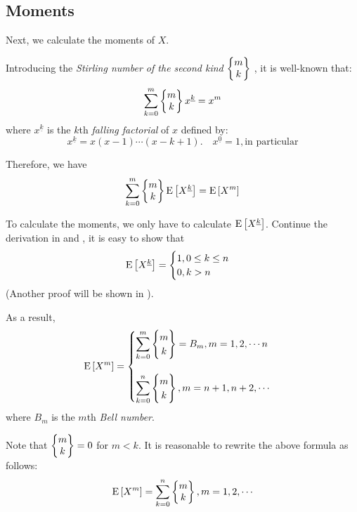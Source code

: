 \subsection{Moments}
\label{sec:moments}
Next, we calculate the moments of $ X$.

Introducing the \emph{Stirling number of the second kind}  $ \left\{\begin{matrix}m\\k\end{matrix}\right\} $ , it is well-known that:
\[ \sum_{k=0}^m\Stir{m}{k}x^{\underline{k}} = x^m\]
where $ x^{\underline{k}}$ is the $ k$th \emph{falling factorial} of $ x$ defined by:
\[ x^{\underline{k}} = x(x-1)\cdots (x-k+1). \quad x^{\underline{0}} = 1, \text{in particular}\]

Therefore, we have
\[ \sum_{k=0}^m\Stir{m}{k}\E{X^{\underline{k}}} = \E{X^m}\]

To calculate the moments, we only have to calculate $ \text{E}\left[X^{\underline{k}}\right]$.
Continue the derivation in  and , it is easy to show that
\[ \text{E}\left[X^{\underline{k}}\right] =\begin{cases} 1, 0\le k\le n\\
0,  k>n\end{cases} \]
(Another proof
will be shown in ).

As a result,
 \begin{equation*}
 \E{X^m} =\begin{cases} \sum_{k=0}^m\Stir{m}{k} = B_m, m = 1,2,\cdots n \\
   \\
  \sum_{k=0}^n\Stir{m}{k}, m  = n+1, n+2,\cdots \end{cases}
  \end{equation*}
where $ B_m$ is the $ m$th \emph{Bell number}.

Note that $ \left\{\begin{matrix}m\\k\end{matrix}\right\} = 0$ for $ m < k$. It is reasonable to rewrite the above formula as follows:
\begin{equation}
  \E{X^m} = \sum_{k=0}^n\Stir{m}{k}, m=1,2,\cdots
  \label{eqn:moments}
\end{equation}

